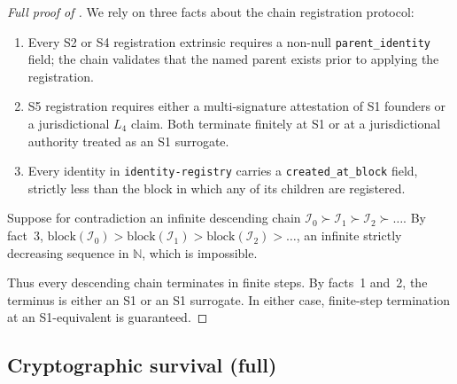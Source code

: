 \documentclass[11pt,a4paper,parskip=half-,DIV=12,headings=standardclasses]{scrartcl}
\theoremstyle{ncthm}
\theoremstyle{ncdef}
\newcommand{\identity}{\mathcal{I}}
\begin{document}
\begin{proof}[Full proof of ]
We rely on three facts about the chain registration protocol:
\begin{enumerate}
\item Every S2 or S4 registration extrinsic requires a non-null
  \texttt{parent\_identity} field; the chain validates that the named
  parent exists prior to applying the registration.
\item S5 registration requires either a multi-signature attestation
  of S1 founders or a jurisdictional $L_4$ claim. Both terminate
  finitely at S1 or at a jurisdictional authority treated as an S1
  surrogate.
\item Every identity in \texttt{identity-registry} carries a
  \texttt{created\_at\_block} field, strictly less than the block in
  which any of its children are registered.
\end{enumerate}

Suppose for contradiction an infinite descending chain
$\identity_0 \succ \identity_1 \succ \identity_2 \succ \ldots$. By
fact~3, $\mathrm{block}(\identity_0) > \mathrm{block}(\identity_1) >
\mathrm{block}(\identity_2) > \ldots$, an infinite strictly
decreasing sequence in $\mathbb{N}$, which is impossible.

Thus every descending chain terminates in finite steps. By facts~1
and~2, the terminus is either an S1 or an S1 surrogate. In either
case, finite-step termination at an S1-equivalent is guaranteed.
\end{proof}

\subsection{Cryptographic survival (full)}
\end{document}
